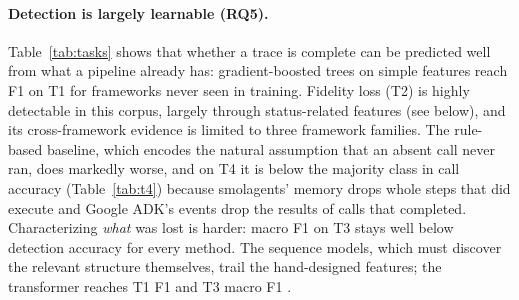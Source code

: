 \documentclass[10pt]{article}
\begin{document}
\begin{table}[t]
\centering\small
{}
\caption{RQ6: the same methods under three evaluation protocols. Random: 80/20 split of all cases, every framework seen in training (mean $\pm$ s.d.\ over five split seeds for feature models, three for sequence models). Held-out: the official split. LOFO: leave one framework out, mean $\pm$ population s.d.\ across held-out frameworks that have positive cases for the task (nine for T1 and T3, three for T2); the transformer is trained once per fold.}
\label{tab:splits}
\end{table}

\paragraph{Detection is largely learnable (RQ5).} Table~\ref{tab:tasks} shows that whether a trace is complete can be predicted well from what a pipeline already has: gradient-boosted trees on simple features reach F1 \gbmTOneF{} on T1 for frameworks never seen in training. Fidelity loss (T2) is highly detectable in this corpus, largely through status-related features (see below), and its cross-framework evidence is limited to three framework families. The rule-based baseline, which encodes the natural assumption that an absent call never ran, does markedly worse, and on T4 it is below the majority class in call accuracy (Table~\ref{tab:t4}) because smolagents' memory drops whole steps that did execute and Google ADK's events drop the results of calls that completed. Characterizing \emph{what} was lost is harder: macro F1 on T3 stays well below detection accuracy for every method. The sequence models, which must discover the relevant structure themselves, trail the hand-designed features; the transformer reaches T1 F1 \seqTOneHeld{} and T3 macro F1 \seqTThreeHeld{}.
\end{document}
